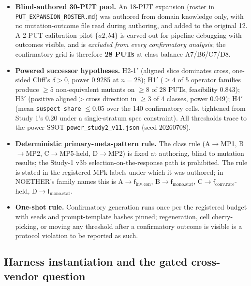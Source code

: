 \documentclass[manuscript,screen,review]{acmart}
\begin{document}
\begin{itemize}

\item
  \textbf{Blind-authored 30-PUT pool.} An 18-PUT expansion (roster in
  \texttt{PUT\_EXPANSION\_ROSTER.md}) was authored from domain knowledge
  only, with no mutation-outcome file read during authoring, and added
  to the original 12. A 2-PUT calibration pilot \(\{a2, b4\}\) is carved
  out for pipeline debugging with outcomes visible, and is
  \emph{excluded from every confirmatory analysis}; the confirmatory
  grid is therefore \textbf{28 PUTs} at class balance A7/B6/C7/D8.
\item
  \textbf{Powered successor hypotheses.} H2-1\('\) (aligned slice
  dominates cross, one-sided Cliff's \(\delta > 0\), power 0.9285 at
  \(n = 28\)); H1\('\) (\(\geq 4\) of 5 operator families produce
  \(\geq 5\) non-equivalent mutants on \(\geq 8\) of 28 PUTs, feasibility
  0.843); H3\('\) (positive aligned\(>\)cross direction in \(\geq 3\) of
  4 classes, power 0.949); H4\('\) (mean \texttt{suspect\_share}
  \(\leq 0.05\) over the 140 confirmatory cells, tightened from Study
  1's 0.20 under a single-stratum spec constraint). All thresholds trace
  to the power SSOT \texttt{power\_study2\_v11.json} (seed 20260708).
\item
  \textbf{Deterministic primary-meta-pattern rule.} The class rule
  (A\(\to\)MP1, B\(\to\)MP2, C\(\to\)MP5-held, D\(\to\)MP2) is fixed at
  authoring, blind to mutation results; the Study-1 v3b
  selection-on-the-response path is prohibited. The rule is stated in the
  registered MPk labels under which it was authored; in NOETHER's family names
  this is A\(\to \mathsf{f}_{\mathrm{inv.con}}\),
  B\(\to \mathsf{f}_{\mathrm{mono.stat}}\),
  C\(\to \mathsf{f}_{\mathrm{conv.rate}}\)-held,
  D\(\to \mathsf{f}_{\mathrm{mono.stat}}\).
\item
  \textbf{One-shot rule.} Confirmatory generation runs once per the
  registered budget with seeds and prompt-template hashes pinned;
  regeneration, cell cherry-picking, or moving any threshold after a
  confirmatory outcome is visible is a protocol violation to be reported
  as such.
\end{itemize}

\subsection{Harness instantiation and the gated cross-vendor
question}\label{study2-harness}
\end{document}
